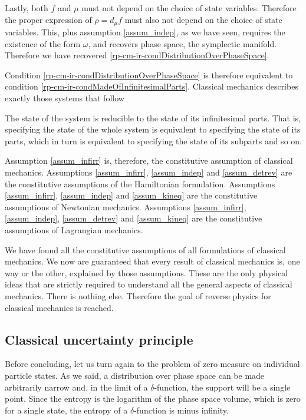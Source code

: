 Lastly, both $f$ and $\mu$ must not depend on the choice of state variables. Therefore the proper expression of $\rho = d_{\mu} f$ must also not depend on the choice of state variables. This, plus assumption \ref{assum_indep}, as we have seen, requires the existence of the form $\omega$, and recovers phase space, the symplectic manifold. Therefore we have recovered \ref{rp-cm-ir-condDistributionOverPhaseSpace}.

Condition \ref{rp-cm-ir-condDistributionOverPhaseSpace} is therefore equivalent to condition \ref{rp-cm-ir-condMadeOfInfinitesimalParts}. Classical mechanics describes exactly those systems that follow
\renewcommand{\theassump}{IR}
\begin{assump}\label{assum_infirr}
	The state of the system is reducible to the state of its infinitesimal parts. That is, specifying the state of the whole system is equivalent to specifying the state of its parts, which in turn is equivalent to specifying the state of its subparts and so on.
\end{assump}
\renewcommand{\theassump}{\Roman{assump}}
Assumption \ref{assum_infirr} is, therefore, the constitutive assumption of classical mechanics. Assumptions \ref{assum_infirr}, \ref{assum_indep} and \ref{assum_detrev} are the constitutive assumptions of the Hamiltonian formulation. Assumptions \ref{assum_infirr}, \ref{assum_indep} and \ref{assum_kineq} are the constitutive assumptions of Newtonian mechanics.  Assumptions \ref{assum_infirr}, \ref{assum_indep}, \ref{assum_detrev} and \ref{assum_kineq} are the constitutive assumptions of Lagrangian mechanics. 

We have found all the constitutive assumptions of all formulations of classical mechanics. We now are guaranteed that every result of classical mechanics is, one way or the other, explained by those assumptions. These are the only physical ideas that are strictly required to understand all the general aspects of classical mechanics. There is nothing else. Therefore the goal of reverse physics for classical mechanics is reached.

\subsection{Classical uncertainty principle}

Before concluding, let us turn again to the problem of zero measure on individual particle states. As we said, a distribution over phase space can be made arbitrarily narrow and, in the limit of a $\delta$-function, the support will be a single point. Since the entropy is the logarithm of the phase space volume, which is zero for a single state, the entropy of a $\delta$-function is minus infinity.

